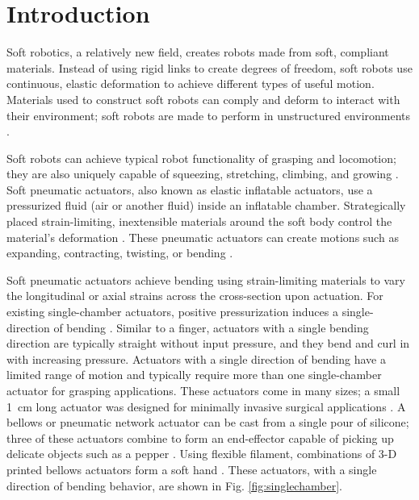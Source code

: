 \chapter{Introduction}

Soft robotics, a relatively new field, creates robots made from soft, compliant materials. Instead of using rigid links to create degrees of freedom, soft robots use continuous, elastic deformation to achieve different types of useful motion. Materials used to construct soft robots can comply and deform to interact with their environment; soft robots are made to perform in unstructured environments \cite{lee_soft_2017}. 

Soft robots can achieve typical robot functionality of grasping and locomotion; they are also uniquely capable of squeezing, stretching, climbing, and growing \cite{laschi_soft_2016}. Soft pneumatic actuators, also known as elastic inflatable actuators, use a pressurized fluid (air or another fluid) inside an inflatable chamber. Strategically placed strain-limiting, inextensible materials around the soft body control the material's deformation \cite{zaidi_actuation_2021}. These pneumatic actuators can create motions such as expanding, contracting, twisting, or bending \cite{gorissen_elastic_2017, al-ibadi_circular_2018}. 

Soft pneumatic actuators achieve bending using strain-limiting materials to vary the longitudinal or axial strains across the cross-section upon actuation. For existing single-chamber actuators, positive pressurization induces a single-direction of bending \cite{galloway_mechanically_2013}. Similar to a finger, actuators with a single bending direction are typically straight without input pressure, and they bend and curl in with increasing pressure. Actuators with a single direction of bending have a limited range of motion and typically require more than one single-chamber actuator for grasping applications. These actuators come in many sizes; a small 1~cm long actuator was designed for minimally invasive surgical applications \cite{mccandless_soft_2022}. A bellows or pneumatic network actuator can be cast from a single pour of silicone; three of these actuators combine to form an end-effector capable of picking up delicate objects such as a pepper \cite{alici_modeling_2018}. Using flexible filament, combinations of 3-D printed bellows actuators form a soft hand \cite{sundaram_dragonclaw_2023}. These actuators, with a single direction of bending behavior, are shown in Fig. \ref{fig:singlechamber}. \\

